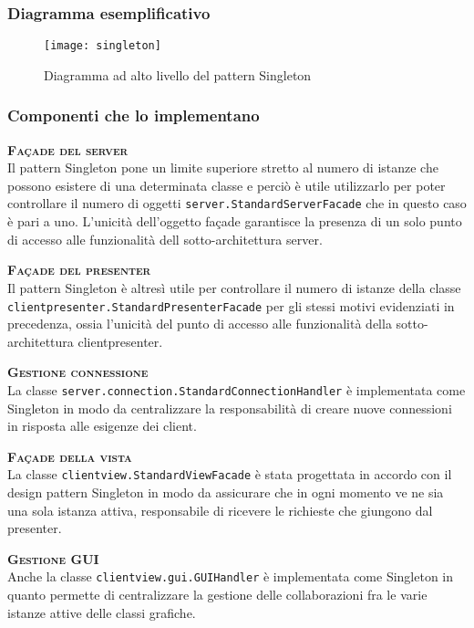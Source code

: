 \subsubsection{Diagramma esemplificativo}
\begin{figure}[H]
\centering
\texttt{[image: singleton]}
\caption{Diagramma ad alto livello del pattern Singleton}\label{fig:singleton}
\end{figure}

\subsubsection{Componenti che lo implementano}
\begin{description}
  \item{\scshape\bfseries Façade del server}\\
Il pattern Singleton pone un limite superiore stretto al numero di istanze che possono esistere di una determinata classe e perciò è utile utilizzarlo per poter controllare il numero di oggetti \texttt{server.StandardServerFacade} che in questo caso è pari a uno. L'unicità dell'oggetto façade garantisce la presenza di un solo punto di accesso alle funzionalità dell sotto-architettura server.
  \item{\scshape\bfseries Façade del presenter}\\
Il pattern Singleton è altresì utile per controllare il numero di istanze della classe \texttt{clientpresenter.StandardPresenterFacade} per gli stessi motivi evidenziati in precedenza, ossia l'unicità del punto di accesso alle funzionalità della sotto-architettura clientpresenter.
  \item{\scshape\bfseries Gestione connessione}\\
La classe \texttt{server.connection.StandardConnectionHandler} è implementata come Singleton in modo da centralizzare la responsabilità di creare nuove connessioni in risposta alle esigenze dei client.
  \item{\scshape\bfseries Façade della vista}\\
La classe \texttt{clientview.StandardViewFacade} è stata progettata in accordo con il design pattern Singleton in modo da assicurare che in ogni momento ve ne sia una sola istanza attiva, responsabile di ricevere le richieste che giungono dal presenter.
  \item{\scshape\bfseries Gestione GUI}\\
Anche la classe \texttt{clientview.gui.GUIHandler} è implementata come Singleton in quanto permette di centralizzare la gestione delle collaborazioni fra le varie istanze attive delle classi grafiche.
\end{description}

